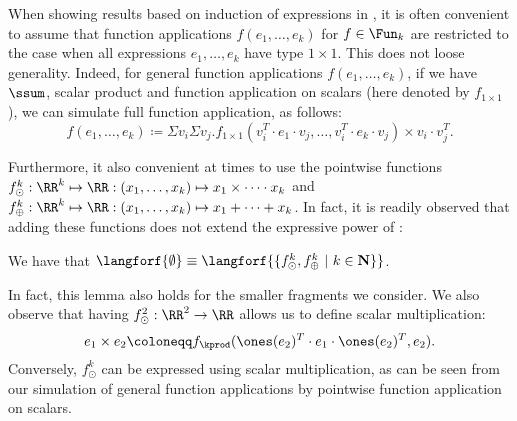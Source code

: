 When showing results based on induction of expressions in \langfor, it is often convenient to assume that function applications $f(e_1,\ldots,e_k)$ for $f\in\Fun_k$ are restricted to
the case when all expressions $e_1,\ldots,e_k$ have type $1\times 1$. This does not loose generality. Indeed,
for general function applications $f(e_1,\ldots,e_k)$, if we have $\ssum$, scalar product and function application on scalars (here denoted by $f_{1\times 1}$), we can simulate full function application, as follows:
 $$
f(e_1,\ldots, e_k) \coloneqq \Sigma v_i \Sigma v_j. f_{1\times 1}(v_i^T\cdot e_1\cdot v_j, \ldots ,v_i^T\cdot e_k\cdot v_j) \times v_i\cdot v_j^T.
$$

Furthermore, it also convenient at times to use the pointwise functions
$f_\odot^k:\RR^k\mapsto \RR:(x_1,\ldots,x_k)\mapsto x_1\times\cdots \cdot x_k$ and 
$f_\oplus^k:\RR^k\mapsto \RR:(x_1,\ldots,x_k)\mapsto x_1+\cdots + x_k$. In fact, it is readily observed that adding these functions does not extend the expressive power of \langfor:
\begin{lemma}
\label{lm-prod-sum}
We have that $\langforf{\emptyset} \equiv \langforf{\{f_\odot^k,f_\oplus^k \ | \ k\in \mathbf{N}\}}$.
\end{lemma}
In fact, this lemma also holds for the smaller fragments we consider.
%
We also observe that having $f_\odot^2:\RR^2\to\RR$ allows us to define scalar multiplication:
$$
e_1\times e_2 \coloneqq f_{\kprod}(\ones(e_2)^T\cdot e_1 \cdot \ones(e_2)^T, e_2).
$$
Conversely, $f_\odot^k$ can be expressed using scalar multiplication, as can be seen from our simulation of general function applications by pointwise function application on scalars.
%
%
%
%
